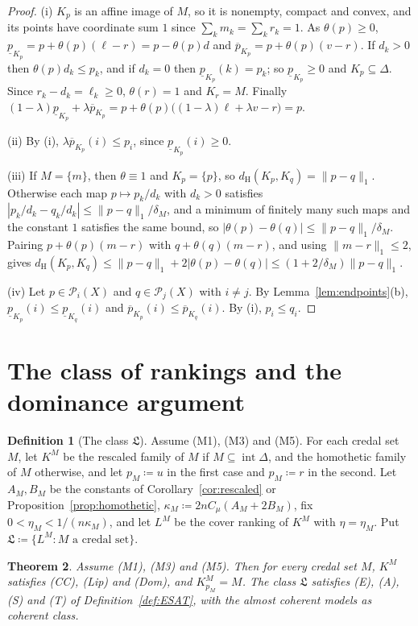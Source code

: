 \documentclass[11pt]{article}
\newtheorem{theorem}{Theorem}[section]
\theoremstyle{definition}
\newtheorem{definition}[theorem]{Definition}
\newcommand{\dH}{d_{\mathrm H}}
\newcommand{\Pc}{\mathcal P}
\newcommand{\Lf}{\mathfrak L}
\newcommand{\lp}{\underline{p}}
\newcommand{\up}{\overline{p}}
\begin{document}
\begin{proof}
(i) $K_p$ is an affine image of $M$, so it is nonempty, compact and convex, and its points have coordinate sum $1$ since $\sum_km_k=\sum_kr_k=1$. As $\theta(p)\ge0$, $\lp_{K_p}=p+\theta(p)(\ell-r)=p-\theta(p)d$ and $\up_{K_p}=p+\theta(p)(v-r)$. If $d_k>0$ then $\theta(p)d_k\le p_k$, and if $d_k=0$ then $\lp_{K_p}(k)=p_k$; so $\lp_{K_p}\ge0$ and $K_p\subseteq\Delta$. Since $r_k-d_k=\ell_k\ge0$, $\theta(r)=1$ and $K_r=M$. Finally $(1-\lambda)\lp_{K_p}+\lambda\up_{K_p}=p+\theta(p)\big((1-\lambda)\ell+\lambda v-r\big)=p$.

(ii) By (i), $\lambda\up_{K_p}(i)\le p_i$, since $\lp_{K_p}(i)\ge0$.

(iii) If $M=\{m\}$, then $\theta\equiv1$ and $K_p=\{p\}$, so $\dH(K_p,K_q)=\|p-q\|_1$. Otherwise each map $p\mapsto p_k/d_k$ with $d_k>0$ satisfies $|p_k/d_k-q_k/d_k|\le\|p-q\|_1/\delta_M$, and a minimum of finitely many such maps and the constant $1$ satisfies the same bound, so $|\theta(p)-\theta(q)|\le\|p-q\|_1/\delta_M$. Pairing $p+\theta(p)(m-r)$ with $q+\theta(q)(m-r)$, and using $\|m-r\|_1\le2$, gives $\dH(K_p,K_q)\le\|p-q\|_1+2|\theta(p)-\theta(q)|\le(1+2/\delta_M)\|p-q\|_1$.

(iv) Let $p\in\Pc_i(X)$ and $q\in\Pc_j(X)$ with $i\ne j$. By Lemma~\ref{lem:endpoints}(b), $\lp_{K_p}(i)\le\lp_{K_q}(i)$ and $\up_{K_p}(i)\le\up_{K_q}(i)$. By (i), $p_i\le q_i$.
\end{proof}

\section{The class of rankings and the dominance argument}\label{sec:class}

\begin{definition}[The class $\Lf$]\label{def:class}
Assume (M1), (M3) and (M5). For each credal set $M$, let $K^M$ be the rescaled family of $M$ if $M\subseteq\operatorname{int}\Delta$, and the homothetic family of $M$ otherwise, and let $p_M\coloneqq u$ in the first case and $p_M\coloneqq r$ in the second. Let $A_M,B_M$ be the constants of Corollary~\ref{cor:rescaled} or Proposition~\ref{prop:homothetic}, $\kappa_M\coloneqq2nC_\mu(A_M+2B_M)$, fix $0<\eta_M<1/(n\kappa_M)$, and let $L^M$ be the cover ranking of $K^M$ with $\eta=\eta_M$. Put $\Lf\coloneqq\{L^M:M\text{ a credal set}\}$.
\end{definition}

\begin{theorem}\label{thm:class}
Assume (M1), (M3) and (M5). Then for every credal set $M$, $K^M$ satisfies (CC), (Lip) and (Dom), and $K^M_{p_M}=M$. The class $\Lf$ satisfies (E), (A), (S) and (T) of Definition~\ref{def:ESAT}, with the almost coherent models as coherent class.
\end{theorem}
\end{document}
